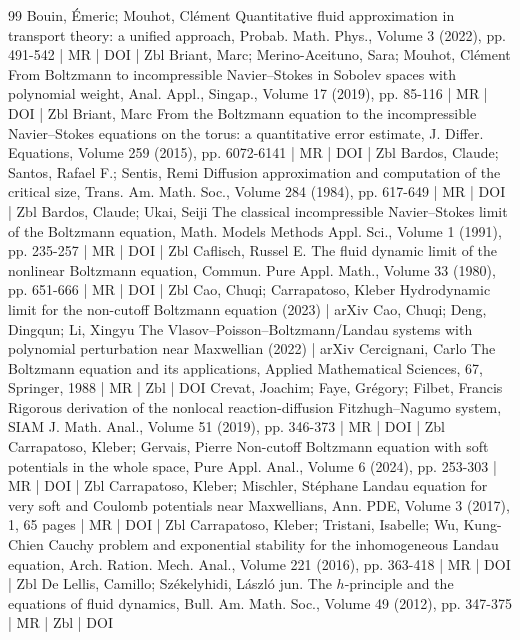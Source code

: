 \begin{thebibliography}{99}
 Bouin, Émeric; Mouhot, Clément Quantitative fluid approximation in transport theory: a unified approach, Probab. Math. Phys., Volume 3 (2022), pp. 491-542 | MR | DOI | Zbl
 Briant, Marc; Merino-Aceituno, Sara; Mouhot, Clément From Boltzmann to incompressible Navier–Stokes in Sobolev spaces with polynomial weight, Anal. Appl., Singap., Volume 17 (2019), pp. 85-116 | MR | DOI | Zbl
 Briant, Marc From the Boltzmann equation to the incompressible Navier–Stokes equations on the torus: a quantitative error estimate, J. Differ. Equations, Volume 259 (2015), pp. 6072-6141 | MR | DOI | Zbl
 Bardos, Claude; Santos, Rafael F.; Sentis, Remi Diffusion approximation and computation of the critical size, Trans. Am. Math. Soc., Volume 284 (1984), pp. 617-649 | MR | DOI | Zbl
 Bardos, Claude; Ukai, Seiji The classical incompressible Navier–Stokes limit of the Boltzmann equation, Math. Models Methods Appl. Sci., Volume 1 (1991), pp. 235-257 | MR | DOI | Zbl
 Caflisch, Russel E. The fluid dynamic limit of the nonlinear Boltzmann equation, Commun. Pure Appl. Math., Volume 33 (1980), pp. 651-666 | MR | DOI | Zbl
 Cao, Chuqi; Carrapatoso, Kleber Hydrodynamic limit for the non-cutoff Boltzmann equation (2023) | arXiv
 Cao, Chuqi; Deng, Dingqun; Li, Xingyu The Vlasov–Poisson–Boltzmann/Landau systems with polynomial perturbation near Maxwellian (2022) | arXiv
 Cercignani, Carlo The Boltzmann equation and its applications, Applied Mathematical Sciences, 67, Springer, 1988 | MR | Zbl | DOI
 Crevat, Joachim; Faye, Grégory; Filbet, Francis Rigorous derivation of the nonlocal reaction-diffusion Fitzhugh–Nagumo system, SIAM J. Math. Anal., Volume 51 (2019), pp. 346-373 | MR | DOI | Zbl
 Carrapatoso, Kleber; Gervais, Pierre Non-cutoff Boltzmann equation with soft potentials in the whole space, Pure Appl. Anal., Volume 6 (2024), pp. 253-303 | MR | DOI | Zbl
 Carrapatoso, Kleber; Mischler, Stéphane Landau equation for very soft and Coulomb potentials near Maxwellians, Ann. PDE, Volume 3 (2017), 1, 65 pages | MR | DOI | Zbl
 Carrapatoso, Kleber; Tristani, Isabelle; Wu, Kung-Chien Cauchy problem and exponential stability for the inhomogeneous Landau equation, Arch. Ration. Mech. Anal., Volume 221 (2016), pp. 363-418 | MR | DOI | Zbl
 De Lellis, Camillo; Székelyhidi, László jun. The $h$-principle and the equations of fluid dynamics, Bull. Am. Math. Soc., Volume 49 (2012), pp. 347-375 | MR | Zbl | DOI

\end{thebibliography}
